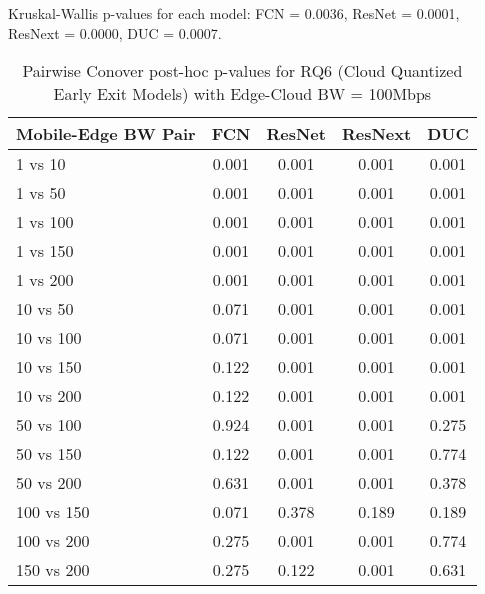 \begin{table}[h]
\centering
\caption{Pairwise Conover post-hoc p-values for RQ6 (Cloud Quantized Early Exit Models) with Edge-Cloud BW = 100Mbps}
\label{tab:conover_cloud_quantized_earlyexit_ec100}
\smallskip
Kruskal-Wallis p-values for each model: FCN = 0.0036, ResNet = 0.0001, ResNext = 0.0000, DUC = 0.0007.

\begin{tabular}{lcccc}
\toprule
Mobile-Edge BW Pair & FCN & ResNet & ResNext & DUC \\
\midrule
1 vs 10 & 0.001 & 0.001 & 0.001 & 0.001 \\
1 vs 50 & 0.001 & 0.001 & 0.001 & 0.001 \\
1 vs 100 & 0.001 & 0.001 & 0.001 & 0.001 \\
1 vs 150 & 0.001 & 0.001 & 0.001 & 0.001 \\
1 vs 200 & 0.001 & 0.001 & 0.001 & 0.001 \\
10 vs 50 & 0.071 & 0.001 & 0.001 & 0.001 \\
10 vs 100 & 0.071 & 0.001 & 0.001 & 0.001 \\
10 vs 150 & 0.122 & 0.001 & 0.001 & 0.001 \\
10 vs 200 & 0.122 & 0.001 & 0.001 & 0.001 \\
50 vs 100 & 0.924 & 0.001 & 0.001 & 0.275 \\
50 vs 150 & 0.122 & 0.001 & 0.001 & 0.774 \\
50 vs 200 & 0.631 & 0.001 & 0.001 & 0.378 \\
100 vs 150 & 0.071 & 0.378 & 0.189 & 0.189 \\
100 vs 200 & 0.275 & 0.001 & 0.001 & 0.774 \\
150 vs 200 & 0.275 & 0.122 & 0.001 & 0.631 \\
\bottomrule
\end{tabular}
\end{table}

